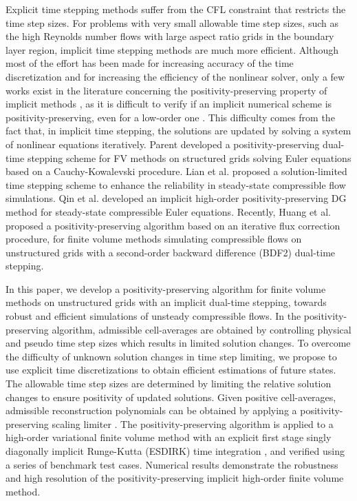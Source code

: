 Explicit time stepping methods suffer from the CFL constraint that restricts the time step sizes. 
For problems with very small allowable time step sizes, such as the high Reynolds number flows with large aspect ratio grids in the boundary layer region,  implicit time stepping methods are much more efficient.
Although most of the effort has been made for increasing accuracy of the time discretization and for increasing the efficiency of the nonlinear solver, only a few works exist in the literature concerning the positivity-preserving property of implicit methods \cite{qin2018implicit}, as it is difficult to verify if an implicit numerical scheme is positivity-preserving, even for a low-order one \cite{huang2024general}. This difficulty comes from the fact that, in implicit time stepping, the solutions are updated by solving a system of nonlinear equations iteratively. Parent \cite{parent2018positivity} developed a positivity-preserving dual-time stepping scheme for FV methods on structured grids solving Euler equations based on a Cauchy-Kowalevski procedure. Lian et al. \cite{lian2009solution} proposed a solution-limited time stepping scheme to enhance the reliability in steady-state compressible flow simulations. Qin et al. \cite{qin2018implicit} developed an implicit high-order positivity-preserving DG method for steady-state compressible Euler equations. Recently, Huang et al. \cite{huang2024general} proposed a positivity-preserving algorithm based on an iterative flux correction procedure, for finite volume methods simulating compressible flows on unstructured grids with a second-order backward difference (BDF2) dual-time stepping. 

In this paper, we develop a positivity-preserving algorithm for finite volume methods on unstructured grids with an implicit dual-time stepping, towards robust and efficient simulations of unsteady compressible flows.
In the positivity-preserving algorithm, admissible cell-averages are obtained by controlling physical and pseudo time step sizes which results in limited solution changes. To overcome the difficulty of unknown solution changes in time step limiting, we propose to use explicit time discretizations to obtain efficient estimations of future states. The allowable time step sizes are determined by limiting the relative solution changes to ensure positivity of updated solutions. Given positive cell-averages, admissible reconstruction polynomials can be obtained by applying a positivity-preserving scaling limiter \cite{zhang2010positivity}. The positivity-preserving algorithm is applied to a high-order variational finite volume method \cite{wang2017compact_VR} with an explicit first stage singly diagonally implicit Runge-Kutta (ESDIRK) time integration \cite{bijl2002implicitBDFvESDIRK}, and verified using a series of benchmark test cases. Numerical results demonstrate the robustness and high resolution of the positivity-preserving implicit high-order finite volume method. 

